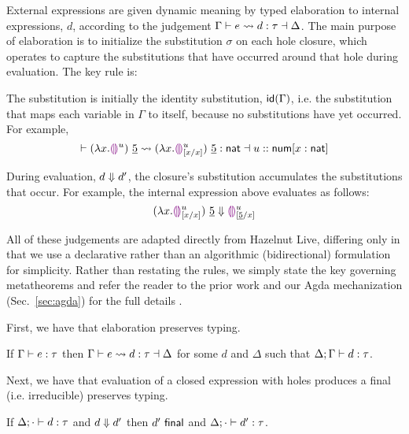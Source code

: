 \newcommand{\tnat}{\mathsf{nat}}

External expressions are given dynamic meaning by typed elaboration to internal expressions, $d$,
according to the judgement $\elabs{\Gamma}{e}{d}{\tau}{\Delta}$.
The main purpose of elaboration is to initialize the substitution $\sigma$ on each hole closure,
which operates to capture
the substitutions that have occurred around that hole during evaluation. The key rule is:
\begin{mathpar}
\end{mathpar}
The substitution is initially the identity substitution, $\idof{\Gamma}$, i.e. the
substitution that maps each variable in $\Gamma$ to itself, because no substitutions have yet occurred. For example,
\[ \elabs{ }{(\hlam{x}{\hehole{u}})~\hnum{5}}{(\hlam{x}{\dehole{u}{[x/x]}})~{\hnum{5}}}{\tnat}{u :: \tnum[x : \tnat]} \]


During evaluation, $\evalsTo{d}{d'}$, the closure's substitution accumulates the substitutions that occur. For example,
the internal expression above evaluates as follows:
\[
  \evalsTo{(\hlam{x}{\dehole{u}{[x/x]}})~{\hnum{5}}}{
      \dehole{u}{[\hnum{5}/x]}
  }
\]


All of these judgements are adapted directly from Hazelnut Live,
differing only in that we use a declarative rather than an algorithmic (bidirectional)
formulation for simplicity. Rather than restating the rules, we simply state the key governing
metatheorems and refer the reader to the prior work and our Agda mechanization (Sec.~\ref{sec:agda}) for the full details \cite{HazelnutLive}.

First, we have that elaboration preserves typing.
\begin{theorem}
    If $\hasType{\Gamma}{e}{\tau}$ then $\elabs{\Gamma}{e}{d}{\tau}{\Delta}$ for some $d$ and $\Delta$ such
    that $\hasTypeD{\Delta}{\Gamma}{d}{\tau}$.
\end{theorem}

Next, we have that evaluation of a closed expression with holes produces a final (i.e. irreducible) preserves typing.
\begin{theorem}[Preservation]
    If $\hasTypeD{\Delta}{\cdot}{d}{\tau}$ and $\evalsTo{d}{d'}$ then $\isFinal{d'}$ and $\hasTypeD{\Delta}{\cdot}{d'}{\tau}$.
\end{theorem}

